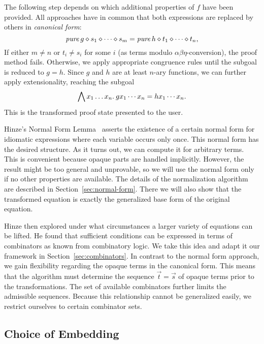 The following step depends on which additional properties of $f$ have been
provided.
All approaches have in common that both expressions are replaced by others in
\emph{canonical form}:
\[ \operatorname{\mathit{pure}}{g} \diamond s_1 \diamond \cdots \diamond s_m = \operatorname{\mathit{pure}}{h} \diamond t_1 \diamond \cdots \diamond t_n, \]
If either $m \ne n$ or $t_i \ne s_i$ for some $i$ (as terms modulo
$\alpha\beta\eta$-conversion), the proof method fails.
Otherwise, we apply appropriate congruence rules until the subgoal is reduced
to $g = h$.
Since $g$ and $h$ are at least $n$-ary functions, we can further apply
extensionality, reaching the subgoal
\[ \bigwedge x_1 \dots x_n.\>g x_1 \cdots x_n = h x_1 \cdots x_n. \]
This is the transformed proof state presented to the user.

Hinze's Normal Form Lemma~\cite[7]{hinze10} asserts the existence of a certain
normal form for idiomatic expressions where each variable occurs only once.
This normal form has the desired structure.
As it turns out, we can compute it for arbitrary terms.
This is convenient because opaque parts are handled implicitly.
However, the result might be too general and unprovable, so we will use the
normal form only if no other properties are available.
The details of the normalization algorithm are described in
Section~\ref{sec:normal-form}.
There we will also show that the transformed equation is exactly the generalized
base form of the original equation.

Hinze then explored under what circumstances a larger variety of equations can
be lifted.
He found that sufficient conditions can be expressed in terms of combinators
as known from combinatory logic.
We take this idea and adapt it our framework in Section~\ref{sec:combinators}.
In contrast to the normal form approach, we gain flexibility regarding the
opaque terms in the canonical form.
This means that the algorithm must determine the sequence $\vec t = \vec s$
of opaque terms prior to the transformations.
The set of available combinators further limits the admissible sequences.
Because this relationship cannot be generalized easily, we restrict ourselves
to certain combinator sets.

\subsection{Choice of Embedding}\label{subsec:embedding}

